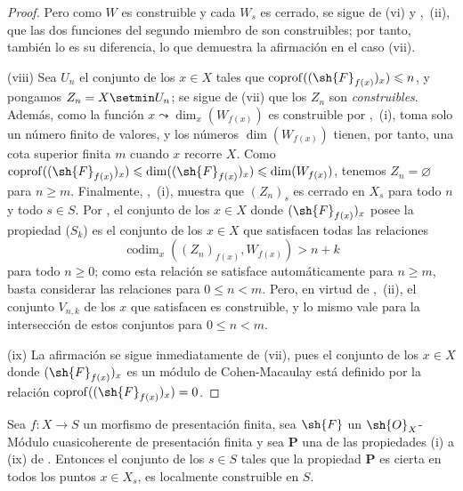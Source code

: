 \begin{proof}
Pero como $W$ es construible  y cada $W_s$ es cerrado, se sigue de (vi) y ,~(ii), que las dos funciones del segundo miembro de  son construibles; por tanto, también lo es su diferencia, lo que demuestra la afirmación en el caso (vii).

(viii) Sea $U_n$ el conjunto de los $x\in X$ tales que $\operatorname{coprof}((\sh{F}_{f(x)})_x)\leqslant n$, y pongamos $Z_n=X\setmin U_n$; se sigue de (vii) que los $Z_n$ son \emph{construibles}.
Además, como la función $x\leadsto\dim_x(W_{f(x)})$ es construible por ,~(i), toma solo un número finito de valores, y los números $\dim(W_{f(x)})$ tienen, por tanto, una cota superior finita $m$ cuando $x$ recorre $X$.
Como $\operatorname{coprof}((\sh{F}_{f(x)})_x)\leqslant\dim((\sh{F}_{f(x)})_x)\leqslant\dim(W_{f(x)})$, tenemos $Z_n=\varnothing$ para $n\geqslant m$.
Finalmente, ,~(i), muestra que $(Z_n)_s$ es cerrado en $X_s$ para todo $n$ y todo $s\in S$.
Por , el conjunto de los $x\in X$ donde $(\sh{F}_{f(x)})_x$ posee la propiedad ($S_k$) es el conjunto de los $x\in X$ que satisfacen todas las relaciones
\begin{equation}
\tag{9.9.2.2}
\label{IV.9.9.2.2}
  \operatorname{codim}_x((Z_n)_{f(x)},W_{f(x)})>n+k
\end{equation}
para todo $n\geqslant 0$; como esta relación se satisface automáticamente para $n\geqslant m$, basta considerar las relaciones  para $0\leqslant n<m$.
Pero, en virtud de ,~(ii), el conjunto $V_{n,k}$ de los $x$ que satisfacen  es construible, y lo mismo vale para la intersección de estos conjuntos para $0\leqslant n<m$.

(ix) La afirmación se sigue inmediatamente de (vii), pues el conjunto de los $x\in X$ donde $(\sh{F}_{f(x)})_x$ es un módulo de Cohen-Macaulay está definido por la relación $\operatorname{coprof}((\sh{F}_{f(x)})_x)=0$.
\end{proof}

\begin{corollary}[9.9.3]
\label{IV.9.9.3}
Sea $f:X\to S$ un morfismo de presentación finita, sea $\sh{F}$ un $\sh{O}_X$-Módulo cuasicoherente de presentación finita y sea $\boldsymbol{P}$ una de las propiedades \textup{(i)} a \textup{(ix)} de .
Entonces el conjunto de los $s\in S$ tales que la propiedad $\boldsymbol{P}$ es cierta en todos los puntos $x\in X_s$, es localmente construible en $S$.
\end{corollary}

